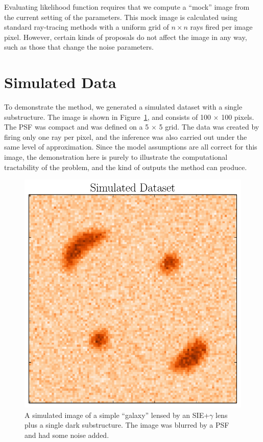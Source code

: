 \documentclass[useAMS,usenatbib]{mn2e}
\begin{document}
Evaluating likelihood function requires that we compute a ``mock'' image from
the current setting of the parameters. This mock image is calculated using
standard ray-tracing methods with a uniform grid of $n \times n$ rays
fired per image pixel. However, certain kinds of proposals do not affect the
image in any way, such as those that change the noise parameters.

\section{Simulated Data}
To demonstrate the method, we generated a simulated dataset with a single
substructure. The image is shown in Figure~\ref{fig:simulated_image}, and
consists of 100 $\times$ 100 pixels. The PSF was compact and was
defined on a 5 $\times$ 5 grid. The data was created by firing only one ray
per pixel, and the inference was also carried out under the same level of
approximation. Since the model assumptions are all correct for this image, the
demonstration here is purely to illustrate the computational tractability of
the problem, and the kind of outputs the method can produce.

\begin{figure}
\begin{center}
\includegraphics[scale=0.5]{simulated_image.pdf}
\caption{A simulated image of a simple ``galaxy'' lensed by an SIE+$\gamma$
lens plus a single dark substructure. The image was blurred by a PSF and had
some noise added.\label{fig:simulated_image}}
\end{center}
\end{figure}
\end{document}
